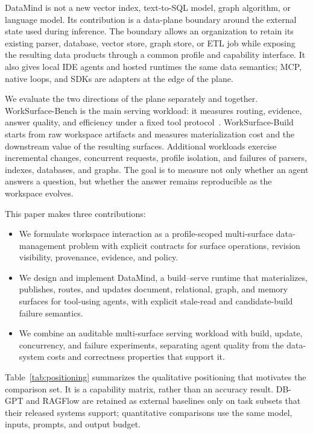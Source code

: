 DataMind is not a new vector index, text-to-SQL model, graph algorithm, or
language model. Its contribution is a data-plane boundary around the external
state used during inference. The boundary allows an organization to retain its
existing parser, database, vector store, graph store, or ETL job while exposing
the resulting data products through a common profile and capability interface.
It also gives local IDE agents and hosted runtimes the same data semantics;
MCP, native loops, and SDKs are adapters at the edge of the plane.

We evaluate the two directions of the plane separately and together.
WorkSurface-Bench is the main serving workload: it measures routing, evidence,
answer quality, and efficiency under a fixed tool protocol~\cite{worksurfacebench2026}.
WorkSurface-Build
starts from raw workspace artifacts and measures materialization cost and the
downstream value of the resulting surfaces. Additional workloads exercise
incremental changes, concurrent requests, profile isolation, and failures of
parsers, indexes, databases, and graphs. The goal is to measure not only
whether an agent answers a question, but whether the answer remains reproducible
as the workspace evolves.

This paper makes three contributions:
\begin{itemize}
  \item We formulate workspace interaction as a profile-scoped
  multi-surface data-management problem with explicit contracts for surface
  operations, revision visibility, provenance, evidence, and policy.
  \item We design and implement DataMind, a build--serve runtime that
  materializes, publishes, routes, and updates document, relational, graph,
  and memory surfaces for tool-using agents, with explicit stale-read and
  candidate-build failure semantics.
  \item We combine an auditable multi-surface serving workload with build,
  update, concurrency, and failure experiments, separating agent quality from
  the data-system costs and correctness properties that support it.
\end{itemize}

Table~\ref{tab:positioning} summarizes the qualitative positioning that
motivates the comparison set. It is a capability matrix, rather than an
accuracy result. DB-GPT and RAGFlow are retained as external baselines only on
task subsets that their released systems support; quantitative comparisons use
the same model, inputs, prompts, and output budget.

